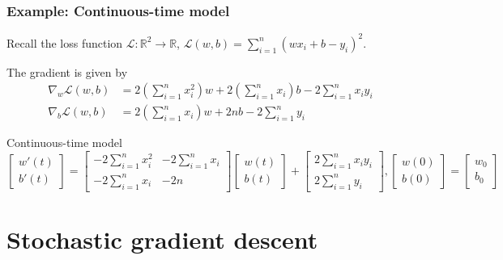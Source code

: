 \documentclass[17pt,institute=e10]{tuhh_presentation}
\newcommand{\R}{\mathbb{R}}
\newcommand{\CL}{\mathcal{L}}
\begin{document}
\begin{frame}[fragile]
  \frametitle{Example: Continuous-time model}
  Recall the loss function $\CL : \R^2 \rightarrow \R$, $\CL(w, b) = \sum_{i=1}^n (w x_i + b - y_i)^2$.

  The gradient is given by 
  \begin{align*}
    \nabla_w \CL(w,b) &= 2\left(\sum_{i=1}^n x_i^2 \right) w + 2\left(\sum_{i=1}^n x_i \right) b - 2 \sum_{i=1}^n x_i y_i \\
    \nabla_b \CL(w,b) &= 2\left(\sum_{i=1}^n x_i \right) w + 2 n b - 2 \sum_{i=1}^n y_i
  \end{align*}
  \begin{block}{Continuous-time model}
  \begin{equation*}
    \begin{bmatrix}
      w'(t)      \\
      b'(t)     
  \end{bmatrix}
  = 
  \begin{bmatrix}
    -2  \displaystyle\sum_{i=1}^n x_i^2  &  -2  \displaystyle\sum_{i=1}^n x_i      \\
      -2  \displaystyle\sum_{i=1}^n x_i  &  -2n      
  \end{bmatrix}
  \begin{bmatrix}
    w(t)     \\
    b(t)    
  \end{bmatrix}
  +
  \begin{bmatrix}
    2  \displaystyle\sum_{i=1}^n x_i y_i     \\
    2  \displaystyle\sum_{i=1}^n y_i    
  \end{bmatrix},
  \begin{bmatrix}
    w(0)     \\
    b(0)    
  \end{bmatrix}
  =
  \begin{bmatrix}
    w_0     \\
    b_0   
  \end{bmatrix}
  \end{equation*}
  
  \end{block}
\end{frame}

\section{Stochastic gradient descent}
\end{document}
